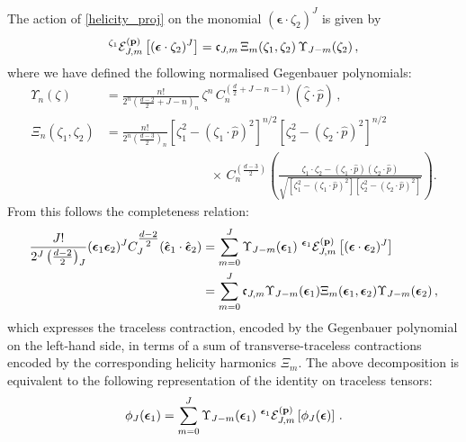 \documentclass[11pt,a4paper]{article}
\begin{document}
The action of \eqref{helicity_proj} on the monomial $(\boldsymbol{\epsilon}\cdot \zeta_2)^J$ is given by
\begin{align}
    {}^{\zeta_1}\mathcal{E}_{J,m}^{({\bf p})}\left[(\boldsymbol{\epsilon}\cdot \zeta_2)^J\right]=\mathfrak{c}_{J,m}\,\Xi_{m}(\zeta_1,\zeta_2)\,{\Upsilon}_{J-m}(\zeta_2)\,,
\end{align}
where we have defined the following normalised Gegenbauer polynomials:
\begin{subequations}
\begin{align}
        {\Upsilon}_{n}(\zeta)&=\frac{n!}{2^{n}\left(\frac{d-2}{2}+J-n\right)_n}\,\zeta^n\,C_{n}^{(\frac{d}{2}+J-n-1)}\left(\hat{\zeta}\cdot\hat{p}\right)\,,\\
        {\Xi}_{n}(\zeta_1,\zeta_2)&=\frac{n!}{2^{n}\left(\frac{d-3}{2}\right)_n}\left[\zeta_1^2-({\zeta_1}\cdot \hat{p})^2\right]^{n/2}\left[\zeta_2^2-({\zeta_2}\cdot \hat{p})^2\right]^{n/2}\label{XiPoly}\\\nonumber
        &\hspace{100pt}\times\,C_{n}^{(\frac{d-3}2)}\left(\tfrac{\zeta_1\cdot \zeta_2-(\zeta_1\cdot\hat{p})(\zeta_2\cdot\hat{p})}{\sqrt{\left[\zeta_1^2-(\zeta_1\cdot \hat{p})^2\right]\left[\zeta_2^2-(\zeta_2\cdot \hat{p})^2\right]}}\right).
\end{align}
\end{subequations}
From this follows the completeness relation:
\begin{align}\label{completeness}
    \frac{J!}{2^J\left(\frac{d-2}{2}\right)_J}(\boldsymbol{\epsilon}_1\boldsymbol{\epsilon}_2)^J C_{J}^{\tfrac{d-2}2}(\hat{\boldsymbol{\epsilon}}_1\cdot\hat{\boldsymbol{\epsilon}}_2)&=\sum_{m=0}^J {\Upsilon}_{J-m}(\boldsymbol{\epsilon}_1)\  {}^{\boldsymbol{\epsilon}_1}\mathcal{E}_{J,m}^{({\bf p})}\left[(\boldsymbol{\epsilon}\cdot\boldsymbol{\epsilon}_2)^J\right]\\&=\sum_{m=0}^J\mathfrak{c}_{J,m} {\Upsilon}_{J-m}(\boldsymbol{\epsilon}_1){\Xi}_{m}(\boldsymbol{\epsilon}_1,\boldsymbol{\epsilon}_2){\Upsilon}_{J-m}(\boldsymbol{\epsilon}_2)\,,\nonumber
\end{align}
which expresses the traceless contraction, encoded by the Gegenbauer polynomial on the left-hand side, in terms of a sum of transverse-traceless contractions encoded by the corresponding helicity harmonics $\Xi_m$. The above decomposition is equivalent to the following representation of the identity on traceless tensors:
\begin{align}
    \phi_J(\boldsymbol{\epsilon}_1)=\sum_{m=0}^{J}\Upsilon_{J-m}(\boldsymbol{\epsilon}_1)\ {}^{\boldsymbol{\epsilon}_1}\mathcal{E}_{J,m}^{({\bf p})}\left[\phi_{J}(\boldsymbol{\epsilon})\right]\,.
\end{align}
\end{document}
